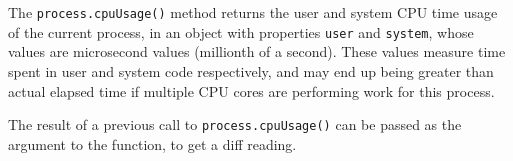 The \texttt{process.cpuUsage()} method returns the user and system CPU
time usage of the current process, in an object with properties
\texttt{user} and \texttt{system}, whose values are microsecond values
(millionth of a second). These values measure time spent in user and
system code respectively, and may end up being greater than actual
elapsed time if multiple CPU cores are performing work for this process.

The result of a previous call to \texttt{process.cpuUsage()} can be
passed as the argument to the function, to get a diff reading.

\begin{Shaded}
\begin{Highlighting}[]
 \OperatorTok{;}

\OperatorTok{=} \NormalTok{()}\OperatorTok{;}

\OperatorTok{=} \NormalTok{()}\OperatorTok{;}
\NormalTok{ (}\NormalTok{() }\OperatorTok{{-}}\OperatorTok{\textless{}} \NormalTok{)}\OperatorTok{;}

\NormalTok{(}\OperatorTok{;}
\end{Highlighting}
\end{Shaded}

\begin{Shaded}
\begin{Highlighting}[]
\OperatorTok{=} \NormalTok{(}\NormalTok{)}\OperatorTok{;}

\OperatorTok{=} \NormalTok{()}\OperatorTok{;}

\OperatorTok{=} \NormalTok{()}\OperatorTok{;}
\NormalTok{ (}\NormalTok{() }\OperatorTok{{-}}\OperatorTok{\textless{}} \NormalTok{)}\OperatorTok{;}

\NormalTok{(}\OperatorTok{;}
\end{Highlighting}
\end{Shaded}

